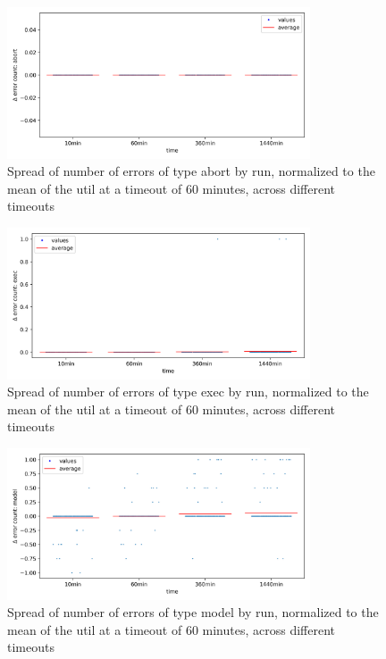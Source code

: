 \documentclass{article}
\begin{document}
\begin{figure}[htbp]
    \centering
    \includegraphics[width=0.8\textwidth]{../plots/num_errors (abort)/changes-by-time.png}
    \captionsetup{width=0.6\textwidth}
    \caption{Spread of number of errors of type abort by run, normalized to the mean of the util at a timeout of 60 minutes, across different timeouts}
\end{figure}
\begin{figure}[htbp]
    \centering
    \includegraphics[width=0.8\textwidth]{../plots/num_errors (exec)/changes-by-time.png}
    \captionsetup{width=0.6\textwidth}
    \caption{Spread of number of errors of type exec by run, normalized to the mean of the util at a timeout of 60 minutes, across different timeouts}
\end{figure}
\begin{figure}[htbp]
    \centering
    \includegraphics[width=0.8\textwidth]{../plots/num_errors (model)/changes-by-time.png}
    \captionsetup{width=0.6\textwidth}
    \caption{Spread of number of errors of type model by run, normalized to the mean of the util at a timeout of 60 minutes, across different timeouts}
\end{figure}
\end{document}
